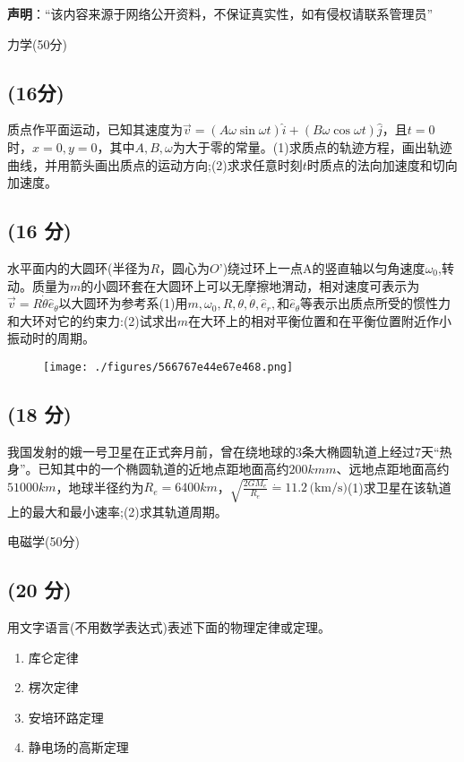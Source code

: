 
\textbf{声明}：“该内容来源于网络公开资料，不保证真实性，如有侵权请联系管理员”

力学(50分)
\subsection{(16分)}
质点作平面运动，已知其速度为$\vec{v} = (A \omega \sin \omega t) \hat{i} + (B \omega \cos \omega t) \hat{j}$，且$t=0$时，$x=0,y=0$，其中$A,B,\omega$为大于零的常量。(1)求质点的轨迹方程，画出轨迹曲线，并用箭头画出质点的运动方向;(2)求求任意时刻$t$时质点的法向加速度和切向
加速度。
\subsection{(16 分)}
水平面内的大圆环(半径为$R$，圆心为$O$’)绕过环上一点A的竖直轴以匀角速度$\omega_0$,转动。质量为$m$的小圆环套在大圆环上可以无摩擦地渭动，相对速度可表示为$\vec{v} =R\dot{\theta}\hat e_\theta$以大圆环为参考系(1)用$m,\omega_0,R,\theta,\dot{\theta},\hat e_r,$和$\hat e_\theta$等表示出质点所受的惯性力和大环对它的约束力:(2)试求出$m$在大环上的相对平衡位置和在平衡位置附近作小振动时的周期。
\begin{figure}[ht]
\centering
\texttt{[image: ./figures/566767e44e67e468.png]}
\caption{} \label{fig_PKU008_1}
\end{figure}
\subsection{(18 分)}
我国发射的娥一号卫星在正式奔月前，曾在绕地球的3条大椭圆轨道上经过7天“热身”。已知其中的一个椭圆轨道的近地点距地面高约$200kmm$、远地点距地面高约$51000km$，地球半径约为$R_e=6400km$，$\sqrt{\frac{2GM_e}{R_e}} \dot= 11.2 \, \text{(km/s)}$(1)求卫星在该轨道上的最大和最小速率;(2)求其轨道周期。

电磁学(50分)

\subsection{(20 分)}
用文字语言(不用数学表达式)表述下面的物理定律或定理。
\begin{enumerate}
\item 库仑定律
\item 楞次定律
\item 安培环路定理
\item 静电场的高斯定理
\end{enumerate}
